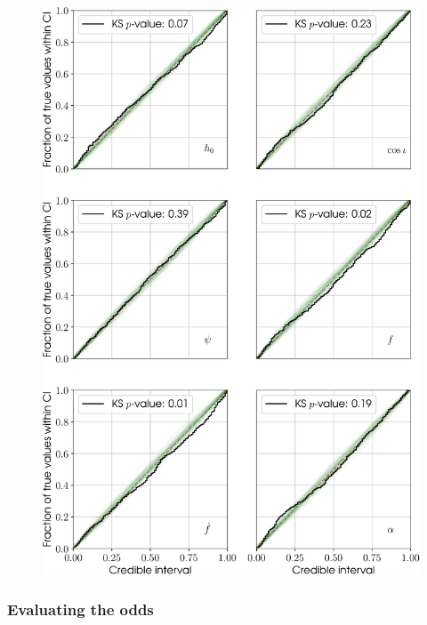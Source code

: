 \begin{figure}[!phtb]
\begin{center}
\includegraphics[width=1\columnwidth]{./figures/codeeval/stats/pp_extra/pp_plots_extra}
\caption{ \protect}
\end{center}
\end{figure}

\subsubsection{Evaluating the odds}\label{sec:evalodds}

